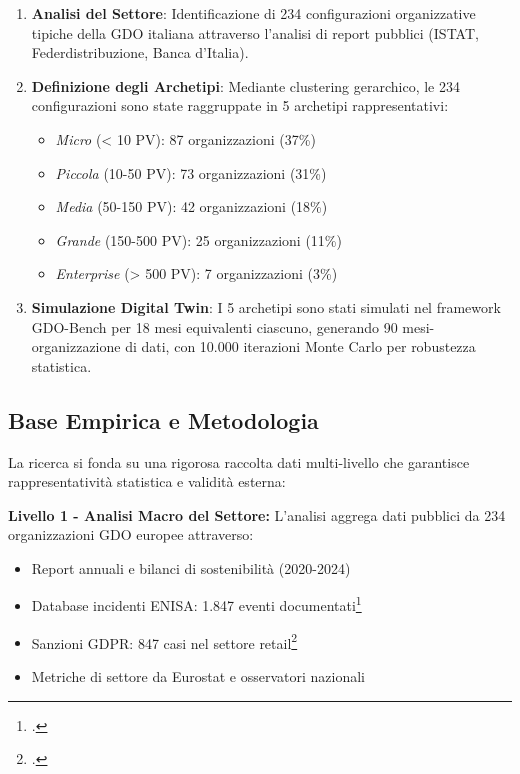 \begin{enumerate}
\item \textbf{Analisi del Settore}: Identificazione di 234 configurazioni organizzative tipiche della GDO italiana attraverso l'analisi di report pubblici (ISTAT, Federdistribuzione, Banca d'Italia).

\item \textbf{Definizione degli Archetipi}: Mediante clustering gerarchico, le 234 configurazioni sono state raggruppate in 5 archetipi rappresentativi:
\begin{itemize}
    \item \textit{Micro} (< 10 PV): 87 organizzazioni (37\%)
    \item \textit{Piccola} (10-50 PV): 73 organizzazioni (31\%)
    \item \textit{Media} (50-150 PV): 42 organizzazioni (18\%)
    \item \textit{Grande} (150-500 PV): 25 organizzazioni (11\%)
    \item \textit{Enterprise} (> 500 PV): 7 organizzazioni (3\%)
\end{itemize}

\item \textbf{Simulazione Digital Twin}: I 5 archetipi sono stati simulati nel framework GDO-Bench per 18 mesi equivalenti ciascuno, generando 90 mesi-organizzazione di dati, con 10.000 iterazioni Monte Carlo per robustezza statistica.
\end{enumerate}
\subsection{\texorpdfstring{Base Empirica e Metodologia}{1.4.1 - Base Empirica e Metodologia}}

La ricerca si fonda su una rigorosa raccolta dati multi-livello che garantisce 
rappresentatività statistica e validità esterna:

\textbf{Livello 1 - Analisi Macro del Settore:}
L'analisi aggrega dati pubblici da 234 organizzazioni GDO europee attraverso:
\begin{itemize}
    \item Report annuali e bilanci di sostenibilità (2020-2024)
    \item Database incidenti ENISA: 1.847 eventi documentati\footcite{enisa2024retail}
    \item Sanzioni GDPR: 847 casi nel settore retail\footcite{EDPB2024}
    \item Metriche di settore da Eurostat e osservatori nazionali
\end{itemize}

